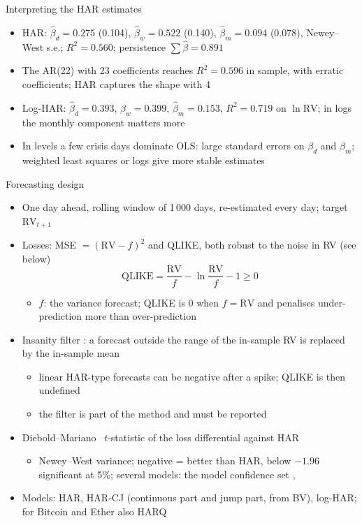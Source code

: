 \begin{frame}{Interpreting the HAR estimates}
\itemsize{\small}
\begin{itemize}
    \item HAR: $\hat\beta_d = 0.275$ (0.104), $\hat\beta_w = 0.522$ (0.140), $\hat\beta_m = 0.094$ (0.078), Newey--West s.e.; $R^2 = 0.560$; persistence $\sum\hat\beta = 0.891$
    \item The AR(22) with 23 coefficients reaches $R^2 = 0.596$ in sample, with erratic coefficients; HAR captures the shape with 4
    \item Log-HAR: $\hat\beta_d = 0.393$, $\hat\beta_w = 0.399$, $\hat\beta_m = 0.153$, $R^2 = 0.719$ on $\ln\mathrm{RV}$; in logs the monthly component matters more
    \item In levels a few crisis days dominate OLS: large standard errors on $\beta_d$ and $\beta_m$; weighted least squares or logs give more stable estimates
\end{itemize}
\end{frame}

\begin{frame}{Forecasting design}
\itemsize{\small}
\begin{itemize}
    \item One day ahead, rolling window of 1\,000 days, re-estimated every day; target $\mathrm{RV}_{t+1}$
    \item Losses: MSE $= (\mathrm{RV} - f)^2$ and QLIKE, both robust to the noise in RV (see below)
    \[ \mathrm{QLIKE} = \frac{\mathrm{RV}}{f} - \ln\frac{\mathrm{RV}}{f} - 1 \ge 0 \]
    \begin{itemize}
        \item $f$: the variance forecast; QLIKE is 0 when $f = \mathrm{RV}$ and penalises under-prediction more than over-prediction
    \end{itemize}
    \item Insanity filter : a forecast outside the range of the in-sample RV is replaced by the in-sample mean
    \begin{itemize}
        \item linear HAR-type forecasts can be negative after a spike; QLIKE is then undefined
        \item the filter is part of the method and must be reported
    \end{itemize}
    \item Diebold--Mariano \ $t$-statistic of the loss differential against HAR
    \begin{itemize}
        \item Newey--West variance; negative = better than HAR, below $-1.96$ significant at 5\%; several models: the model confidence set , 
    \end{itemize}
    \item Models: HAR, HAR-CJ (continuous part and jump part, from BV), log-HAR; for Bitcoin and Ether also HARQ
\end{itemize}
\end{frame}

